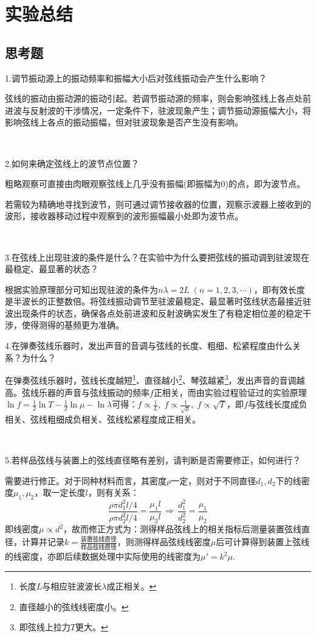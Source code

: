 \documentclass[UTF-8,twoside,cs4size]{ctexart}
\begin{document}
	\section{实验总结}
	\subsection{思考题}
	1.调节振动源上的振动频率和振幅大小后对弦线振动会产生什么影响？
	
	{\kaishu 弦线的振动由振动源的振动引起。若调节振动源的频率，则会影响弦线上各点处前进波与反射波的干涉情况，一定条件下，驻波现象产生；调节振动源振幅大小，将影响弦线上各点的振动振幅，但对驻波现象是否产生没有影响。}
	
	~\
	
	2.如何来确定弦线上的波节点位置？
	
	{\kaishu 粗略观察可直接由肉眼观察弦线上几乎没有振幅(即振幅为0)的点，即为波节点。}
	
	{\kaishu 若需较为精确地寻找到波节，则可通过调节接收器的位置，观察示波器上接收到的波形，接收器移动过程中观察到的波形振幅最小处即为波节点。}
	
	~\
	
	3.在弦线上出现驻波的条件是什么？在实验中为什么要把弦线的振动调到驻波现在最稳定、最显著的状态？
	
	{\kaishu 根据实验原理部分可知出现驻波的条件为$ n\lambda = 2L\;(n=1,2,3,\cdots) $，即有效长度是半波长的正整数倍。将弦线振动调节至驻波最稳定、最显著时弦线状态最接近驻波出现条件的状态，确保各点处前进波和反射波确实发生了有稳定相位差的稳定干涉，使得测得的基频更为准确。}
	
	4.在弹奏弦线乐器时，发出声音的音调与弦线的长度、粗细、松紧程度由什么关系？为什么？
	
	{\kaishu 在弹奏弦线乐器时，弦线长度越短\footnote{长度$ L $与相应驻波波长$ \lambda $成正相关。}、直径越小\footnote{直径越小的弦线线密度小。}、琴弦越紧\footnote{即弦线上拉力$ T $更大。}，发出声音的音调越高。弦线乐器的声音与弦线振动的频率$ f $正相关，而由实验过程验证过的实验原理$ \ln f=\frac12\ln T-\frac12\ln\mu-\ln\lambda $可得：$ f\propto\frac1L,\;f\propto\frac{1}{\sqrt\mu},\;f\propto\sqrt T $，即$ f $与弦线长度成负相关、弦线粗细成负相关、弦线松紧程度成正相关。}
	
	~\
	
	5.若样品弦线与装置上的弦线直径略有差别，请判断是否需要修正，如何进行？
	
	{\kaishu 需要进行修正。对于同种材料而言，其密度$ \rho $一定，则对于不同直径$ d_1,d_2 $下的线密度$ \mu_1,\mu_2 $，取一定长度$ l $，则有关系：}
	\[\frac{\rho\pi d_1^2l/4}{\rho\pi d_2^2l/4}=\frac{\mu_1l}{\mu_2l}\,\Longrightarrow\,\frac{d_1^2}{d_2^2}=\frac{\mu_1}{\mu_2}\]
	{\kaishu 即线密度$ \mu\propto d^2 $，故而修正方式为：测得样品弦线上的相关指标后测量装置弦线直径，计算并记录$ k=\frac{\text{装置弦线直径}}{\text{样品弦线直径}} $，则测得样品弦线线密度$ \mu $后可计算得到装置上弦线的线密度，亦即后续数据处理中实际使用的线密度为$ \mu'=k^2\mu $.}
	
\end{document}
